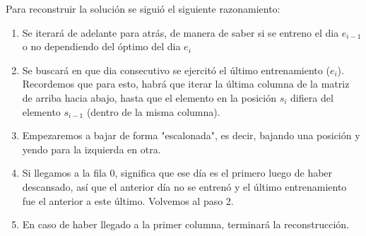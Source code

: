 Para reconstruir la solución se siguió el siguiente razonamiento:

\begin{enumerate}
	\item Se iterará de adelante para atrás, de manera de saber si se entreno el dia $e_{i-1}$ o no dependiendo del óptimo del dia $e_i$
	\item Se buscará en que dia consecutivo se ejercitó el último entrenamiento ($e_i$). Recordemos que para esto, habrá que iterar la última columna de la matriz de arriba hacia abajo, hasta que el elemento en la posición $s_i$ difiera del elemento $s_{i-1}$ (dentro de la misma columna).
	\item Empezaremos a bajar de forma "escalonada", es decir, bajando una posición y yendo para la izquierda en otra.
	\item Si llegamos a la fila 0, significa que ese día es el primero luego de haber descansado, así que el anterior día no se entrenó y el último entrenamiento fue el anterior a este último. Volvemos al paso 2.
	\item En caso de haber llegado a la primer columna, terminará la reconstrucción.
\end{enumerate}



